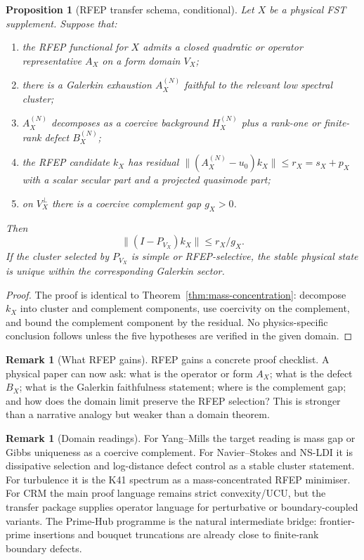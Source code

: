 \documentclass[11pt,a4paper]{article}
\theoremstyle{plain}
\newtheorem{proposition}[theorem]{Proposition}
\theoremstyle{definition}
\newtheorem{remark}[theorem]{Remark}
\begin{document}
\begin{proposition}[RFEP transfer schema, conditional]
\label{prop:rfep-transfer-schema}
Let $X$ be a physical FST supplement.  Suppose that:
\begin{enumerate}[leftmargin=*]
\item the RFEP functional for $X$ admits a closed quadratic or
  operator representative $A_X$ on a form domain $V_X$;
\item there is a Galerkin exhaustion $A_X^{(N)}$ faithful to the
  relevant low spectral cluster;
\item $A_X^{(N)}$ decomposes as a coercive background
  $H_X^{(N)}$ plus a rank-one or finite-rank defect $B_X^{(N)}$;
\item the RFEP candidate $k_X$ has residual
  $\|(A_X^{(N)}-u_0)k_X\|\le r_X=s_X+p_X$ with a scalar secular
  part and a projected quasimode part;
\item on $V_X^\perp$ there is a coercive complement gap $g_X>0$.
\end{enumerate}
Then
\[
  \|(I-P_{V_X})k_X\|\le r_X/g_X.
\]
If the cluster selected by $P_{V_X}$ is simple or RFEP-selective,
the stable physical state is unique within the corresponding
Galerkin sector.
\end{proposition}

\begin{proof}
The proof is identical to Theorem~\ref{thm:mass-concentration}:
decompose $k_X$ into cluster and complement components, use
coercivity on the complement, and bound the complement component by
the residual.  No physics-specific conclusion follows unless the
five hypotheses are verified in the given domain.
\end{proof}

\begin{remark}[What RFEP gains]
\label{rem:rfep-gain}
RFEP gains a concrete proof checklist.  A physical paper can now ask:
what is the operator or form $A_X$; what is the defect $B_X$; what
is the Galerkin faithfulness statement; where is the complement gap;
and how does the domain limit preserve the RFEP selection?  This is
stronger than a narrative analogy but weaker than a domain theorem.
\end{remark}

\begin{remark}[Domain readings]
\label{rem:domain-readings}
For Yang--Mills the target reading is mass gap or Gibbs uniqueness
as a coercive complement.  For Navier--Stokes and NS-LDI it is
dissipative selection and log-distance defect control as a stable
cluster statement.  For turbulence it is the K41 spectrum as a
mass-concentrated RFEP minimiser.  For CRM the main proof language
remains strict convexity/UCU, but the transfer package supplies
operator language for perturbative or boundary-coupled variants.
The Prime-Hub programme \cite{PrimeHubSynthesis} is the natural
intermediate bridge: frontier-prime insertions and bouquet
truncations are already close to finite-rank boundary defects.
\end{remark}
\end{document}
